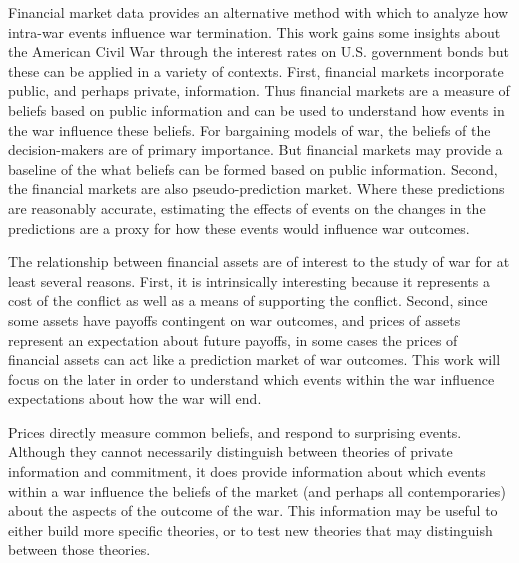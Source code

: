 
Financial market data provides an alternative method with which to analyze how intra-war events influence war termination.
This work gains some insights about the American Civil War through the interest rates on U.S. government bonds but these can be applied in a variety of contexts.
First, financial markets incorporate public, and perhaps private, information.
Thus financial markets are a measure of beliefs based on public information and can be used to understand how events in the war influence these beliefs.
For bargaining models of war, the beliefs of the decision-makers are of primary importance.
But financial markets may provide a baseline of the what beliefs can be formed based on public information.
Second, the financial markets are also pseudo-prediction market.
Where these predictions are reasonably accurate, estimating the effects of events on the changes in the predictions are a proxy for how these events would influence war outcomes.

The relationship between financial assets are of interest to the study of war for at least several reasons.
First, it is intrinsically interesting because it represents a cost of the conflict as well as a means of supporting the conflict.
Second, since some assets have payoffs contingent on war outcomes, and prices of assets represent an expectation about future payoffs, in some cases the prices of financial assets can act like a prediction market of war outcomes.
This work will focus on the later in order to understand which events within the war influence expectations about how the war will end.


Prices directly measure common beliefs, and respond to surprising events.
Although they cannot necessarily distinguish between theories of private information and commitment, it does provide information about which events within a war influence the beliefs of the market (and perhaps all contemporaries) about the aspects of the outcome of the war.
This information may be useful to either build more specific theories, or to test new theories that may distinguish between those theories.

